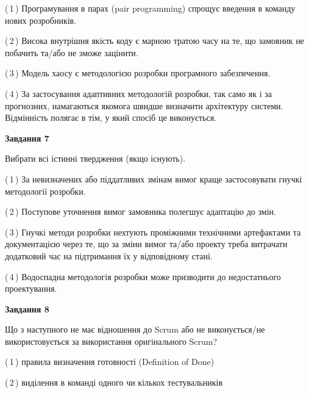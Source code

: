 \documentclass[10pt, ukrainian]{article}
\begin{document}
{\begin {large}
(\,1\,) Програмування в парах (pair programming) спрощує введення в команду нових розробників. %



(\,2\,) Висока внутрішня якість коду є марною тратою часу на те, що замовник не побачить та/або не зможе зацінити. %



(\,3\,) Модель хаосу є методологією розробки програмного забезпечення. %



(\,4\,) За застосування адаптивних методологій розробки, так само як і за прогнозних, намагаються якомога швидше визначити архітектуру системи. Відмінність полягає в тім, у який спосіб це виконується.%


{\begin {center}\textbf{Завдання 7}\end {center}}\par
Вибрати всі істинні твердження (якщо існують).\par
\vspace{2mm}



(\,1\,) За невизначених або піддатливих змінам вимог краще застосовувати гнучкі методології розробки. %



(\,2\,) Поступове уточнення вимог замовника полегшує адаптацію до змін. %



(\,3\,) Гнучкі методи розробки нехтують проміжними технічними артефактами та документацією через те, що за зміни вимог та/або проекту треба витрачати додатковий час на підтримання їх у відповідному стані. %



(\,4\,) Водоспадна методологія розробки може призводити до недостатнього проектування. %


{\begin {center}\textbf{Завдання 8}\end {center}}\par
Що з наступного не має відношення до Scrum або не виконується/не використовується за використання оригінального Scrum?\par
\vspace{2mm}



(\,1\,) правила визначення готовності (Definition of Done) %



(\,2\,) виділення в команді одного чи кількох тестувальників%




\end{large}}
\end{document}
